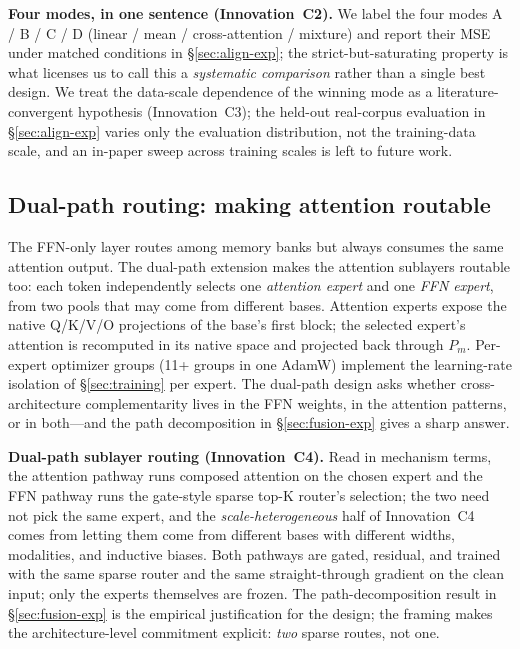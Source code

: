 \documentclass[10pt,twoside]{article}
\theoremstyle{definition}
\begin{document}
\textbf{Four modes, in one sentence (Innovation~C2).} We label the four modes A / B / C / D (linear / mean / cross-attention / mixture) and report their MSE under matched conditions in \S\ref{sec:align-exp}; the strict-but-saturating property is what licenses us to call this a \emph{systematic comparison} rather than a single best design. We treat the data-scale dependence of the winning mode as a literature-convergent hypothesis (Innovation~C3); the held-out real-corpus evaluation in \S\ref{sec:align-exp} varies only the evaluation distribution, not the training-data scale, and an in-paper sweep across training scales is left to future work.

\subsection{Dual-path routing: making attention routable}
\label{sec:dualpath}

The FFN-only layer routes among memory banks but always consumes the same attention output. The dual-path extension makes the attention sublayers routable too: each token independently selects one \emph{attention expert} and one \emph{FFN expert}, from two pools that may come from different bases. Attention experts expose the native Q/K/V/O projections of the base's first block; the selected expert's attention is recomputed in its native space and projected back through $P_m$. Per-expert optimizer groups (11+ groups in one AdamW) implement the learning-rate isolation of \S\ref{sec:training} per expert. The dual-path design asks whether cross-architecture complementarity lives in the FFN weights, in the attention patterns, or in both---and the path decomposition in \S\ref{sec:fusion-exp} gives a sharp answer.

\textbf{Dual-path sublayer routing (Innovation~C4).} Read in mechanism terms, the attention pathway runs composed attention on the chosen expert and the FFN pathway runs the gate-style sparse top-K router's selection; the two need not pick the same expert, and the \emph{scale-heterogeneous} half of Innovation~C4 comes from letting them come from different bases with different widths, modalities, and inductive biases. Both pathways are gated, residual, and trained with the same sparse router and the same straight-through gradient on the clean input; only the experts themselves are frozen. The path-decomposition result in \S\ref{sec:fusion-exp} is the empirical justification for the design; the framing makes the architecture-level commitment explicit: \emph{two} sparse routes, not one.
\end{document}
